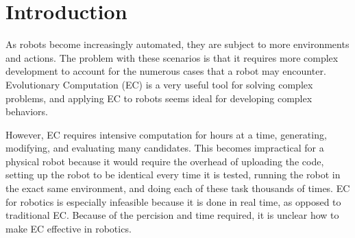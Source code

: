 \documentclass{sig-alternate}
\newcommand{\mycomment}[1]{\textcolor{red}{#1}}
\begin{document}




	
\section{Introduction}
 As robots become increasingly automated, they are subject to more environments and actions. The problem with these scenarios is that it requires more complex development to account for the numerous cases that a robot may encounter. Evolutionary Computation (EC) is a very useful tool for solving complex problems, and applying EC to robots seems ideal for developing complex behaviors.
 
 However, EC requires intensive computation for hours at a time, generating, modifying, and evaluating many candidates. This becomes impractical for a physical robot because it would require the overhead of uploading the code, setting up the robot to be identical every time it is tested, running the robot in the exact same environment, and doing each of these task  thousands of times. EC for robotics is especially infeasible because it is done in real time, as opposed to traditional EC. Because of the percision and time required, it is unclear how to make EC effective in robotics.
 
\end{document}
